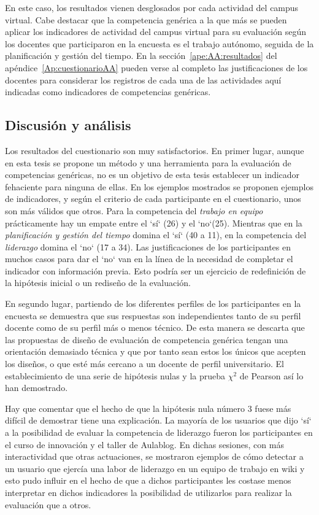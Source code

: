 En este caso, los resultados vienen desglosados por cada actividad del campus virtual. Cabe destacar que la competencia genérica a la que más se pueden aplicar los indicadores de actividad del campus virtual para su evaluación según los docentes que participaron en la encuesta es el trabajo autónomo, seguida de la planificación y gestión del tiempo. En la sección~\ref{ape:AA:resultados} del apéndice~\ref{Ap:cuestionarioAA} pueden verse al completo las justificaciones de los docentes para considerar los registros de cada una de las actividades aquí indicadas como indicadores de competencias genéricas.

\subsection{Discusión y análisis}

Los resultados del cuestionario son muy satisfactorios. En primer lugar, aunque en esta tesis se propone un método y una herramienta para la evaluación de competencias genéricas, no es un objetivo de esta tesis establecer un indicador fehaciente para ninguna de ellas. En los ejemplos mostrados se proponen ejemplos de indicadores, y según el criterio de cada participante en el cuestionario, unos son más válidos que otros. Para la competencia del \emph{trabajo en equipo} prácticamente hay un empate entre el `sí` (26) y el `no`(25). Mientras que en la \emph{planificación y gestión del tiempo} domina el `sí` (40 a 11), en la competencia del \emph{liderazgo} domina el `no` (17 a 34). Las justificaciones de los participantes en muchos casos para dar el `no` van en la línea de la necesidad de completar el indicador con información previa. Esto podría ser un ejercicio de redefinición de la hipótesis inicial o un rediseño de la evaluación.

En segundo lugar, partiendo de los diferentes perfiles de los participantes en la encuesta se demuestra que sus respuestas son independientes tanto de su perfil docente como de su perfil más o menos técnico. De esta manera se descarta que las propuestas de diseño de evaluación de competencia genérica tengan una orientación demasiado técnica y que por tanto sean estos los únicos que acepten los diseños, o que esté más cercano a un docente de perfil universitario. El establecimiento de una serie de hipótesis nulas y la prueba $\chi^2$ de Pearson así lo han demostrado.

Hay que comentar que el hecho de que la hipótesis nula número 3 fuese más difícil de demostrar tiene una explicación. La mayoría de los usuarios que dijo `sí` a la posibilidad de evaluar la competencia de liderazgo fueron los participantes en el curso de innovación y el taller de Aulablog. En dichas sesiones, con más interactividad que otras actuaciones, se mostraron ejemplos de cómo detectar a un usuario que ejercía una labor de liderazgo en un equipo de trabajo en wiki y esto pudo influir en el hecho de que a dichos participantes les costase menos interpretar en dichos indicadores la posibilidad de utilizarlos para realizar la evaluación que a otros. %

